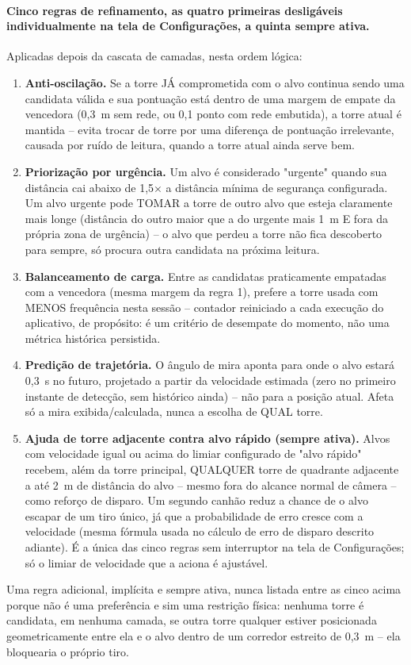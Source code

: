 \documentclass[12pt,a4paper]{article}
\begin{document}
\paragraph{Cinco regras de refinamento, as quatro primeiras
desligáveis individualmente na tela de Configurações, a quinta sempre ativa.} Aplicadas depois da
cascata de camadas, nesta ordem lógica:
\begin{enumerate}
  \item \textbf{Anti-oscilação.} Se a torre JÁ comprometida com o alvo continua sendo uma candidata
  válida e sua pontuação está dentro de uma margem de empate da vencedora (0,3~m sem rede, ou 0,1
  ponto com rede embutida), a torre atual é mantida -- evita trocar de torre por uma diferença de
  pontuação irrelevante, causada por ruído de leitura, quando a torre atual ainda serve bem.
  \item \textbf{Priorização por urgência.} Um alvo é considerado "urgente" quando sua distância cai
  abaixo de 1,5$\times$ a distância mínima de segurança configurada. Um alvo urgente pode TOMAR a
  torre de outro alvo que esteja claramente mais longe (distância do outro maior que a do urgente
  mais 1~m E fora da própria zona de urgência) -- o alvo que perdeu a torre não fica descoberto para
  sempre, só procura outra candidata na próxima leitura.
  \item \textbf{Balanceamento de carga.} Entre as candidatas praticamente empatadas com a vencedora
  (mesma margem da regra 1), prefere a torre usada com MENOS frequência nesta sessão -- contador
  reiniciado a cada execução do aplicativo, de propósito: é um critério de desempate do momento, não
  uma métrica histórica persistida.
  \item \textbf{Predição de trajetória.} O ângulo de mira aponta para onde o alvo estará 0,3~s no
  futuro, projetado a partir da velocidade estimada (zero no primeiro instante de detecção, sem
  histórico ainda) -- não para a posição atual. Afeta só a mira exibida/calculada, nunca a escolha
  de QUAL torre.
  \item \textbf{Ajuda de torre adjacente contra alvo rápido (sempre ativa).} Alvos com velocidade
  igual ou acima do limiar configurado de "alvo rápido" recebem, além da torre principal, QUALQUER
  torre de quadrante adjacente a até 2~m de distância do alvo -- mesmo fora do alcance normal de
  câmera -- como reforço de disparo. Um segundo canhão reduz a chance de o alvo escapar de um tiro
  único, já que a probabilidade de erro cresce com a velocidade (mesma fórmula usada no cálculo de
  erro de disparo descrito adiante). É a única das cinco regras sem interruptor na tela de
  Configurações; só o limiar de velocidade que a aciona é ajustável.
\end{enumerate}
Uma regra adicional, implícita e sempre ativa, nunca listada entre as cinco acima porque não é uma
preferência e sim uma restrição física: nenhuma torre é candidata, em nenhuma camada, se outra torre
qualquer estiver posicionada geometricamente entre ela e o alvo dentro de um corredor estreito de
0,3~m -- ela bloquearia o próprio tiro.
\end{document}
